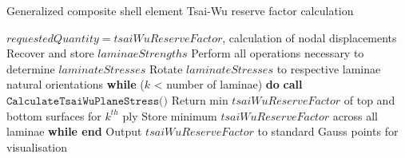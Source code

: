 \begin{algorithm}
	\onehalfspacing
	\caption{Generalized composite shell element Tsai-Wu reserve factor calculation}
	\label{general composite shell tsai pseudocode}
	\begin{algorithmic}[1]
		\Require $requestedQuantity = tsaiWuReserveFactor$, calculation of nodal displacements
		\State Recover and store $laminaeStrengths$
		\State Perform all operations necessary to determine $laminateStresses$
		\State Rotate $laminateStresses$ to respective laminae natural orientations
		\State \hspace{\algorithmicindent}\textbf{while} ($k$ < number of laminae) \textbf{do}
		\State \hspace{\algorithmicindent}\hspace{\algorithmicindent}\textbf{call} $\texttt{CalculateTsaiWuPlaneStress()}$
		\State \hspace{\algorithmicindent}\hspace{\algorithmicindent}\hspace{\algorithmicindent}Return min $tsaiWuReserveFactor$ of top and bottom surfaces for $k^{th}$ ply
		\State \hspace{\algorithmicindent} \hspace{\algorithmicindent}Store minimum $tsaiWuReserveFactor$ across all laminae
		\State \hspace{\algorithmicindent}\textbf{while end}
		\State Output $tsaiWuReserveFactor$ to standard Gauss points for visualisation
		\EndWhile
	\end{algorithmic}
\end{algorithm}